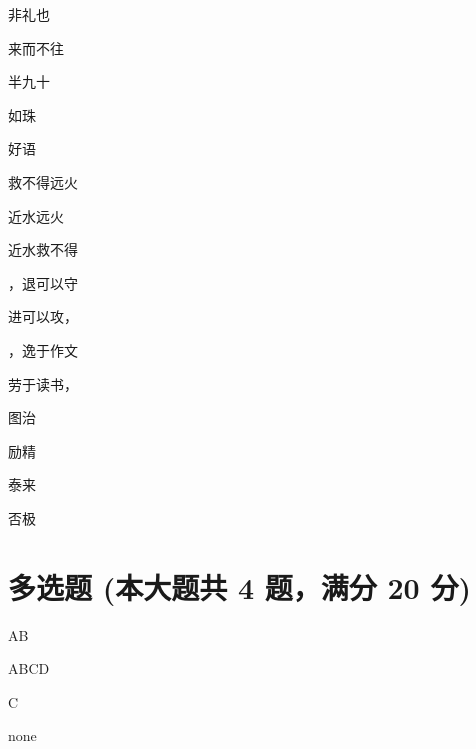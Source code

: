 \documentclass[12pt, a4paper, addpoints, answers]{exam}
\begin{document}
\begin{multicols}{2}
\begin{questions}
\question[2] \fillin 非礼也

\question[2] 来而不往\fillin 

\question[2] \fillin 半九十

\question[2] \fillin 如珠

\question[2] 好语\fillin 

\question[2] \fillin 救不得远火

\question[2] 近水\fillin 远火

\question[2] 近水救不得\fillin 

\question[2] \fillin ，退可以守

\question[2] 进可以攻，\fillin 

\question[2] \fillin ，逸于作文

\question[2] 劳于读书，\fillin 

\question[2] \fillin 图治

\question[2] 励精\fillin 

\question[2] \fillin 泰来

\question[2] 否极\fillin 

\end{questions}
\end{multicols}

\hspace{5cm}

\section{\normalsize{多选题 (本大题共 4 题，满分 20 分)}}
\hspace{1.5cm}

\begin{questions}
\question[5] AB

\begin{oneparcheckboxes}
\end{oneparcheckboxes}

\question[5] ABCD

\begin{oneparcheckboxes}
\end{oneparcheckboxes}

\question[5] C

\begin{oneparcheckboxes}
\end{oneparcheckboxes}

\question[5] none

\begin{oneparcheckboxes}
\end{oneparcheckboxes}

\end{questions}
\end{document}
